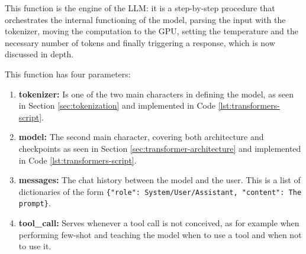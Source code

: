 This function is the engine of the LLM: it is a step-by-step procedure that orchestrates the internal functioning of the model, parsing the input with the tokenizer, moving the computation to the GPU, setting the temperature and the necessary number of tokens and finally triggering a response, which is now discussed in depth.

This function has four parameters:
\begin{enumerate}
    \item \textbf{tokenizer:} Is one of the two main characters in defining the model, as seen in Section \ref{sec:tokenization} and implemented in Code \ref{lst:transformers-script}.
    \item \textbf{model:} The second main character, covering both architecture and checkpoints as seen in Section \ref{sec:transformer-architecture} and implemented in Code \ref{lst:transformers-script}.
    \item \textbf{messages:} The chat history between the model and the user. This is a list of dictionaries of the form \texttt{\{"role": System/User/Assistant, "content": The prompt\}}.
    \item \textbf{tool\_call:} Serves whenever a tool call is not conceived, as for example when performing few-shot and teaching the model when to use a tool and when not to use it.
\end{enumerate}

